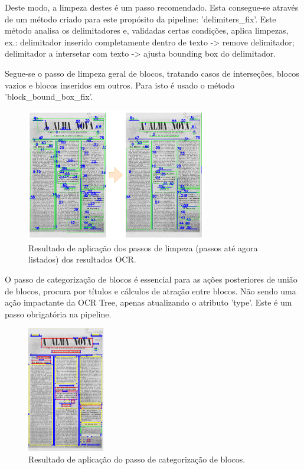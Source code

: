 Deste modo, a limpeza destes é um passo recomendado. Esta consegue-se através de um método criado para este propósito da pipeline: 'delimiters\_fix'. Este método analisa os delimitadores e, validadas certas condições, aplica limpezas, ex.: delimitador inserido completamente dentro de texto -> remove delimitador; delimitador a intersetar com texto -> ajusta bounding box do delimitador.



Segue-se o passo de limpeza geral de blocos, tratando casos de interseções, blocos vazios e blocos inseridos em outros. Para isto é usado o método 'block\_bound\_box\_fix'.


\begin{figure}[H]
	\centering
	\includegraphics[width=0.7\textwidth]{images/ilustracoes/pipeline_clean_ocr_example.png}
	\caption{Resultado de aplicação dos passos de limpeza (passos até agora listados) dos resultados OCR.}
	\label{fig:pipeline_clean_ocr_example}
\end{figure}



O passo de categorização de blocos é essencial para as ações posteriores de união de blocos, procura por títulos e cálculos de atração entre blocos. Não sendo uma ação impactante da OCR Tree, apenas atualizando o atributo 'type'. Este é um passo obrigatória na pipeline.

\begin{figure}[H]
	\centering
	\includegraphics[width=0.3\textwidth]{images/ilustracoes/pipeline_categorize_ocr_example.png}
	\caption{Resultado de aplicação do passo de categorização de blocos.}
	\label{fig:pipeline_categorize_ocr_example}
\end{figure}



